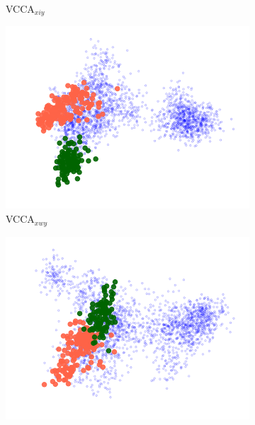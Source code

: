 \begin{figure}[t]
\begin{subfigure}[b]{0.3\textwidth}
         \caption{VCCA$_{x i y}$}
         \label{fig:pca_vcca_xiy_apples}
     \end{subfigure} 
     \begin{subfigure}[b]{0.3\textwidth}
         \centering
         \includegraphics[width=\textwidth]{PaperB/figures_and_tables/latent_space_visualizations/apples_new/pca_latent_apples_vcca_xwy_seed2.png}
         \caption{VCCA$_{x w y}$}
         \label{fig:pca_vcca_xwy_apples}
     \end{subfigure} 
     \begin{subfigure}[b]{0.3\textwidth}
         \centering
         \includegraphics[width=\textwidth]{PaperB/figures_and_tables/latent_space_visualizations/apples_new/pca_latent_apples_vcca_xiwy_seed2.png}

\end{subfigure}
\end{figure}
